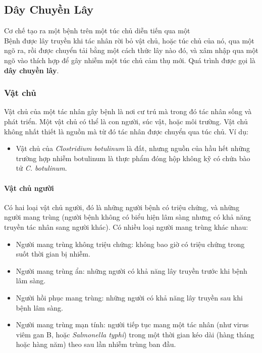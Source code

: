 \documentclass[
]{book}
\providecommand{\tightlist}{%
  \setlength{\itemsep}{0pt}\setlength{\parskip}{0pt}}
\begin{document}
\hypertarget{duxe2y-chuyux1ec1n-luxe2y}{%
\subsection{Dây Chuyền Lây}\label{duxe2y-chuyux1ec1n-luxe2y}}

Cơ chế tạo ra một bệnh trên một túc chủ diễn tiến qua một\\
Bệnh được lây truyền khi tác nhân rời bỏ vật chủ, hoặc túc chủ của nó, qua một ngõ ra, rồi được chuyển tải bằng một cách thức lây nào đó, và xâm nhập qua một ngõ vào thích hợp để gây nhiễm một túc chủ cảm thụ mới. Quá trình được gọi là \textbf{dây chuyền lây}.

\hypertarget{vux1eadt-chux1ee7}{%
\subsubsection{Vật chủ}\label{vux1eadt-chux1ee7}}

Vật chủ của một tác nhân gây bệnh là nơi cư trú mà trong đó tác nhân sống và phát triển. Một vật chủ có thể là con người, súc vật, hoặc môi trường. Vật chủ không nhất thiết là nguồn mà từ đó tác nhân được chuyển qua túc chủ. Ví dụ:

\begin{itemize}
\tightlist
\item
  Vật chủ của \emph{Clostridium botulinum} là đất, nhưng nguồn của hầu hết những trường hợp nhiễm botulinum là thực phẩm đóng hộp không kỹ có chứa bào tử \emph{C. botulinum}.
\end{itemize}

\hypertarget{vux1eadt-chux1ee7-ngux1b0ux1eddi}{%
\paragraph{Vật chủ người}\label{vux1eadt-chux1ee7-ngux1b0ux1eddi}}

Có hai loại vật chủ người, đó là những người bệnh có triệu chứng, và những người mang trùng (người bệnh không có biểu hiện lâm sàng nhưng có khả năng truyền tác nhân sang người khác). Có nhiều loại người mang trùng khác nhau:

\begin{itemize}
\tightlist
\item
  Người mang trùng không triệu chứng: không bao giờ có triệu chứng trong suốt thời gian bị nhiễm.
\item
  Người mang trùng ẩn: những người có khả năng lây truyền trước khi bệnh lâm sàng.
\item
  Người hồi phục mang trùng: những người có khả năng lây truyền sau khi bệnh lâm sàng.
\item
  Người mang trùng mạn tính: người tiếp tục mang một tác nhân (như virus viêm gan B, hoặc \emph{Salmonella typhi}) trong một thời gian kéo dài (hàng tháng hoặc hàng năm) theo sau lần nhiễm trùng ban đầu.
\end{itemize}
\end{document}
